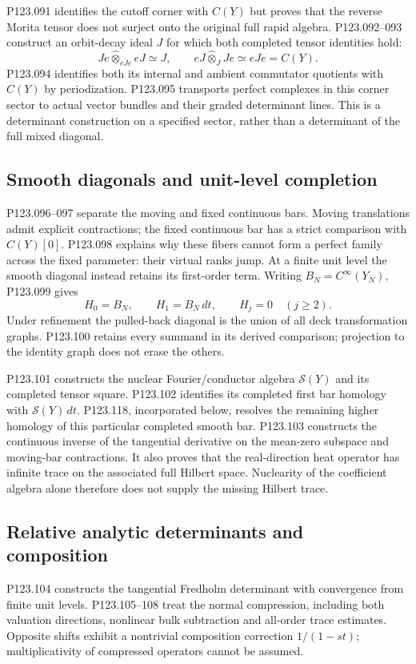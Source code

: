 P123.091 identifies the cutoff corner with $C(Y)$ but proves that the
reverse Morita tensor does not surject onto the original full rapid
algebra. P123.092--093 construct an orbit-decay ideal $J$ for which
both completed tensor identities hold:
\[
 Je\widehat\otimes_{eJe}eJ\simeq J,
 \qquad eJ\widehat\otimes_J Je\simeq eJe=C(Y).
\]
P123.094 identifies both its internal and ambient commutator quotients
with $C(Y)$ by periodization. P123.095 transports perfect complexes in
this corner sector to actual vector bundles and their graded determinant
lines. This is a determinant construction on a specified sector, rather
than a determinant of the full mixed diagonal.

\subsection{Smooth diagonals and unit-level completion}
P123.096--097 separate the moving and fixed continuous bars. Moving
translations admit explicit contractions; the fixed continuous bar has
a strict comparison with $C(Y)[0]$. P123.098 explains why these fibers
cannot form a perfect family across the fixed parameter: their virtual
ranks jump. At a finite unit level the smooth diagonal instead retains
its first-order term. Writing $B_N=C^\infty(Y_N)$, P123.099 gives
\[
 H_0=B_N,\qquad H_1=B_N\,dt,\qquad H_j=0\quad(j\geq2).
\]
Under refinement the pulled-back diagonal is the union of all deck
transformation graphs. P123.100 retains every summand in its derived
comparison; projection to the identity graph does not erase the others.

P123.101 constructs the nuclear Fourier/conductor algebra
$\mathcal S(Y)$ and its completed tensor square. P123.102 identifies
its completed first bar homology with $\mathcal S(Y)\,dt$.
P123.118, incorporated below, resolves the remaining higher homology
of this particular completed smooth bar.
P123.103 constructs the continuous inverse of the tangential derivative
on the mean-zero subspace and moving-bar contractions. It also proves
that the real-direction heat operator has infinite trace on the
associated full Hilbert space. Nuclearity of the coefficient algebra
alone therefore does not supply the missing Hilbert trace.

\subsection{Relative analytic determinants and composition}
P123.104 constructs the tangential Fredholm determinant with convergence
from finite unit levels. P123.105--108 treat the normal compression,
including both valuation directions, nonlinear bulk subtraction and
all-order trace estimates. Opposite shifts exhibit a nontrivial
composition correction $1/(1-st)$; multiplicativity of compressed
operators cannot be assumed.

